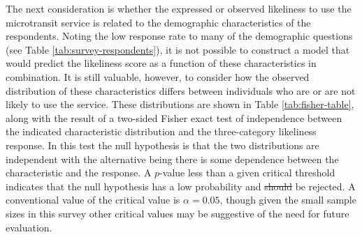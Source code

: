 \documentclass[smartcities,article,submit,moreauthors,pdftex]{Definitions/mdpi}
\providecommand{\DIFadd}[1]{{\protect\color{blue}\uwave{#1}}} %
\providecommand{\DIFdel}[1]{{\protect\color{red}\sout{#1}}}                      %
\providecommand{\DIFaddbegin}{} %
\providecommand{\DIFaddend}{} %
\providecommand{\DIFdelbegin}{} %
\providecommand{\DIFdelend}{} %
\begin{document}
The next consideration is whether the expressed or observed likeliness to use the microtransit service is related to the demographic characteristics of the respondents. Noting the low response rate to many of the demographic questions (see Table \ref{tab:survey-respondents}), it is not possible to construct a model that would predict the likeliness score as a function of these characteristics in combination. It is still valuable, however, to consider how the observed distribution of these characteristics differs between individuals who are or are not likely to use the service. These distributions are shown in Table \ref{tab:fisher-table}, along with the result of a two-sided Fisher exact test of independence between the indicated characteristic distribution and the three-category likeliness response. In this test the null hypothesis is that the two distributions are independent with the alternative being there is some dependence between the characteristic and the response. A $p$-value less than a given critical threshold indicates that the null hypothesis has a low probability and \DIFdelbegin \DIFdel{should }\DIFdelend \DIFaddbegin \DIFadd{may }\DIFaddend be rejected. A conventional value of the critical value is $\alpha=0.05$, though given the small sample sizes in this survey other critical values may be suggestive of the need for future evaluation.
\end{document}
